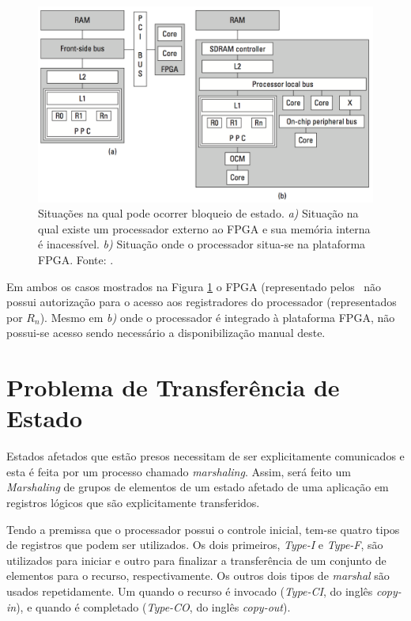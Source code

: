 \begin{description}
      \begin{figure}[h] \centering
         \includegraphics[width=1\textwidth]{img/f4-7.png}
         \caption{Situações na qual pode ocorrer bloqueio de estado. \textit{a)} Situação na qual existe um processador externo ao FPGA e sua memória interna é inacessível. \textit{b)} Situação onde o processador situa-se na plataforma FPGA. Fonte: \citet{Sass2010}.}
         \label{fig:4-7}
      \end{figure}
      
      Em ambos os casos mostrados na Figura \ref{fig:4-7} o FPGA (representado pelos \cores\ não possui autorização para o acesso aos registradores do processador (representados por $R_n$). Mesmo em \textit{b)} onde o processador é integrado à plataforma FPGA, não possui-se acesso sendo necessário a disponibilização manual deste.
   \end{description}
   
   
   \section{Problema de Transferência de Estado}
   Estados afetados que estão presos necessitam de ser explicitamente comunicados e esta é feita por um processo chamado \textit{marshaling}.
   Assim, será feito um \textit{Marshaling} de grupos de elementos de um estado afetado de uma aplicação em registros lógicos que são explicitamente transferidos.
   
   Tendo a premissa que o processador possui o controle inicial, tem-se quatro tipos de registros que podem ser utilizados.
   Os dois primeiros, \textit{Type-I} e \textit{Type-F}, são utilizados para iniciar e outro para finalizar a transferência de um conjunto de elementos para o recurso, respectivamente.
   Os outros dois tipos de \textit{marshal} são usados repetidamente. Um quando o recurso é invocado (\textit{Type-CI}, do inglês \textit{copy-in}), e quando é completado (\textit{Type-CO}, do inglês \textit{copy-out}).
   
